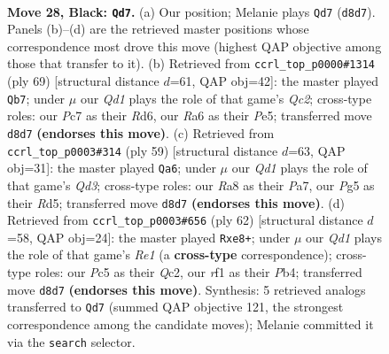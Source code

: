 \documentclass[11pt]{article}
\begin{document}
\clearpage

\begin{figure}[p]\centering
\begin{subfigure}{0.46\textwidth}\centering
\resizebox{\linewidth}{!}{%
\newchessgame
\chessboard[
  setfen={r2q2k1/2p2p2/r6p/2p1p1p1/2P1P1P1/3P3Q/7K/1NB2R2 b - - 13 28},
  showmover=false,
  pgfstyle=straightmove, color=movearrow, markmove={d8-d7}
]}
\caption{}
\end{subfigure}\hfill
\begin{subfigure}{0.46\textwidth}\centering
\resizebox{\linewidth}{!}{%
\newchessgame
\chessboard[
  setfen={6k1/2q4p/3rp1p1/pp2p1P1/4P3/P4P2/1PP5/1K3Q1R b - - 3 35},
  showmover=false,
  pgfstyle=straightmove, color=movearrow, markmove={c7-b7}
]}
\caption{}
\end{subfigure}
\\[4pt]
\begin{subfigure}{0.46\textwidth}\centering
\resizebox{\linewidth}{!}{%
\newchessgame
\chessboard[
  setfen={6k1/p4pp1/3qp2p/2pr4/7P/PPQ3P1/4PP2/2R3K1 b - - 5 30},
  showmover=false,
  pgfstyle=straightmove, color=movearrow, markmove={d6-a6}
]}
\caption{}
\end{subfigure}\hfill
\begin{subfigure}{0.46\textwidth}\centering
\resizebox{\linewidth}{!}{%
\newchessgame
\chessboard[
  setfen={3rr1k1/2p2p1p/ppP5/5P1q/1P3P2/P7/2Q4P/R3R1K1 w - - 0 32},
  showmover=false,
  pgfstyle=straightmove, color=movearrow, markmove={e1-e8}
]}
\caption{}
\end{subfigure}
\caption{\textbf{Move 28, Black: \texttt{Qd7}.} (a) Our position; Melanie plays \texttt{Qd7} (\texttt{d8d7}). Panels (b)--(d) are the retrieved master positions whose correspondence most drove this move (highest QAP objective among those that transfer to it). (b) Retrieved from \texttt{ccrl\_top\_p0000\#1314} (ply 69) [structural distance $d$=61, QAP obj=42]: the master played \texttt{Qb7}; under $\mu$ our \emph{Qd1} plays the role of that game's \emph{Qc2}; cross-type roles: our \emph{P}c7 as their \emph{R}d6, our \emph{R}a6 as their \emph{P}e5; transferred move \texttt{d8d7} \textbf{(endorses this move)}. (c) Retrieved from \texttt{ccrl\_top\_p0003\#314} (ply 59) [structural distance $d$=63, QAP obj=31]: the master played \texttt{Qa6}; under $\mu$ our \emph{Qd1} plays the role of that game's \emph{Qd3}; cross-type roles: our \emph{R}a8 as their \emph{P}a7, our \emph{P}g5 as their \emph{R}d5; transferred move \texttt{d8d7} \textbf{(endorses this move)}. (d) Retrieved from \texttt{ccrl\_top\_p0003\#656} (ply 62) [structural distance $d$=58, QAP obj=24]: the master played \texttt{Rxe8+}; under $\mu$ our \emph{Qd1} plays the role of that game's \emph{Re1} (a \textbf{cross-type} correspondence); cross-type roles: our \emph{P}c5 as their \emph{Q}c2, our \emph{r}f1 as their \emph{P}b4; transferred move \texttt{d8d7} \textbf{(endorses this move)}. Synthesis: 5 retrieved analogs transferred to \texttt{Qd7} (summed QAP objective 121, the strongest correspondence among the candidate moves); Melanie committed it via the \texttt{search} selector.}
\label{fig:thought-m55}
\end{figure}
\end{document}

